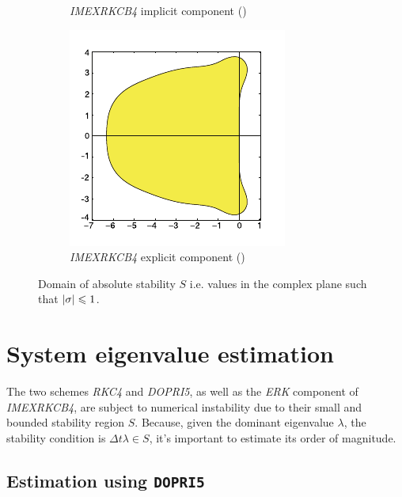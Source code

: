\documentclass[final]{jpp}
\DeclarePairedDelimiter\abs{\lvert}{\rvert}
\begin{document}
\begin{figure}
\begin{subfigure}{0.30 \textwidth}
\caption{\textit{IMEXRKCB4} implicit component (\cite{lowstorageimex})}
\label{fig:dirk-stability}
\end{subfigure}
\hspace{0.02\textwidth}
\begin{subfigure}{0.30 \textwidth}
\includegraphics[width=\textwidth]{imex-erk-stability.pdf}
\caption{\textit{IMEXRKCB4} explicit component (\cite{lowstorageimex})}
\label{fig:erk-stability}
\end{subfigure}
\caption{Domain of absolute stability $S$ i.e. values in the complex plane such that $\abs{\sigma} \le 1$.}
\end{figure}

\section{System eigenvalue estimation}

The two schemes \textit{RKC4} and \textit{DOPRI5}, as well as the \textit{ERK} component of \textit{IMEXRKCB4}, are subject to numerical instability due to their small and bounded stability region $S$. Because, given the dominant eigenvalue $\lambda$, the stability condition is $\Delta t \lambda \in S$, it's important to estimate its order of magnitude.

\subsection{Estimation using \texttt{DOPRI5}}
\end{document}
